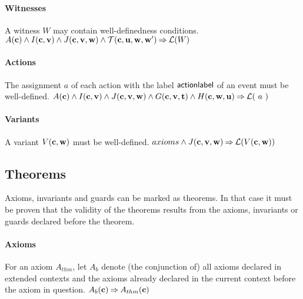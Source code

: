 \paragraph{Witnesses}
\label{well_definedness_of_witnesses}
A witness $W$ may contain well-definedness conditions.
%
  {$A(\mathbf{c}) \land I(\mathbf{c},\mathbf{v}) \land J(\mathbf{c},\mathbf{v},\mathbf{w}) \land
    \mathcal{T}(\mathbf{c},\mathbf{u},\mathbf{w},\mathbf{w}')
    \mathbin\Rightarrow \mathcal{L}(W)$}

\paragraph{Actions}
\label{well_definedness_of_actions}
The assignment $a$ of each action with the label $\textsf{actionlabel}$ of
 an event must be well-defined.
%
  {}%
  {$A(\mathbf{c}) \land I(\mathbf{c},\mathbf{v}) \land J(\mathbf{c},\mathbf{v},\mathbf{w}) \land
    G(\mathbf{c},\mathbf{v},\mathbf{t}) \land H(\mathbf{c},\mathbf{w},\mathbf{u}) \mathbin\Rightarrow \mathcal{L}(~a~)$}

\paragraph{Variants}
\label{well_definedness_of_variants}
A variant $V(\mathbf{c},\mathbf{w})$ must be well-defined.
%
  {$axioms \land J(\mathbf{c},\mathbf{v},\mathbf{w}) \mathbin\Rightarrow \mathcal{L}(V(\mathbf{c},\mathbf{w}))$}


\subsection{Theorems}
\label{theorems}
Axioms, invariants and guards can be marked as theorems. In that case it must be proven that
  the validity of the theorems results from the axioms, invariants or guards declared before
  the theorem.

\paragraph{Axioms}
\label{axioms_as_theorems}
For an axiom $A_{thm}$, 
  let $A_b$ denote (the conjunction of) all axioms declared
  in extended contexts and the axioms already declared in
  the current context before the axiom in question.
%
  {$A_b(\mathbf{c}) \mathbin\Rightarrow A_{thm}(\mathbf{c})$}

